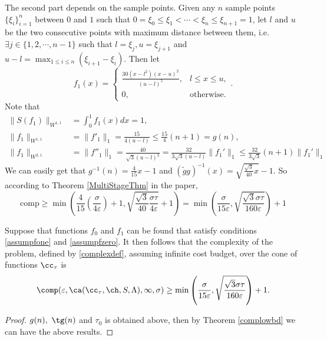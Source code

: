The second part depends on the sample points. Given any $n$ sample points $\{\xi_i\}_{i=1}^{n}$ between $0$ and $1$ such that $0=\xi_0\leq \xi_1<\cdots<\xi_n\leq \xi_{n+1}=1$, let $l$ and $u$ be the two consecutive points with maximum distance between them, i.e. $\exists j\in \{1,2,\cdots,n-1\}$ such that $l=\xi_j, u=\xi_{j+1}$ and $u-l=\max_{1\leq i\leq n}(\xi_{i+1}-\xi_i)$. Then let
$$f_1(x)=\begin{cases}  \displaystyle  \frac{30(x-l^2)(x-u)^2}{(u-l)^5}, & l\leq x\leq u,\\[2ex]
 \displaystyle  0, & \text{otherwise}.
\end{cases}.$$
Note that
\begin{align*}
    \|S(f_1)\|_{W^{1,1}}&=\int_{0}^{1}f_1(x)dx=1,\\
    \|f_1\|_{W^{1,1}}&=\|f'_{1}\|_1=\frac{15}{4(u-l)}\leq \frac{15}{4}(n+1)=g(n),\\
    \|f_1\|_{W^{2,1}}&=\|f''_{1}\|_1=\frac{40}{\sqrt{3}(u-l)^2}=\frac{32}{3\sqrt{3}(u-l)}\|f_1'\|_1\leq \frac{32}{3\sqrt{3}}(n+1)\|f_1'\|_1%
\end{align*}
We can easily get that $g^{-1}(n)=\frac{4}{15}x-1$ and $(\tilde{g}g)^{-1}(x)=\sqrt{\frac{\sqrt{3}}{40}x}-1$. So according to Theorem \ref{MultiStageThm} in the paper, $$\text{comp}\geq \min\left(\frac{4}{15}(\frac{\sigma}{4\varepsilon})+1,\sqrt{\frac{\sqrt{3}}{40}\frac{\sigma\tau}{4\varepsilon}}+1\right)=\min\left(\frac{\sigma}{15\varepsilon},\sqrt{\frac{\sqrt{3}\sigma\tau}{160\varepsilon}}\right)+1$$


\begin{theorem} \label{complowbdinteg} Suppose that functions $f_{0}$ and $f_1$ can be found that satisfy conditions \eqref{assumpfone} and \eqref{assumpfzero}.  It then follows that the complexity of the problem, defined by \eqref{complexdef}, assuming infinite cost budget, over the cone of functions $\cc_{\tau}$ is
$$
\comp(\varepsilon,\ca(\cc_{\tau},\ch,S,\Lambda),\infty,\sigma)
\ge \min\left(\frac{\sigma}{15\varepsilon},\sqrt{\frac{\sqrt{3}\sigma\tau}{160\varepsilon}}\right)+1.
$$
\end{theorem}

\begin{proof}
$g(n), \ \tg(n)$ and $\tau_0$ is obtained above, then by Theorem \ref{complowbd}
we can have the above results.
\end{proof}

